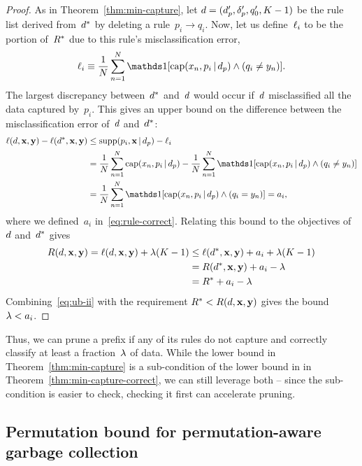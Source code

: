 \begin{proof}
As in Theorem~\ref{thm:min-capture},
let ${{d} =  (d_p', \delta_p', q_0', K-1)}$ be the rule list
derived from~$d^*$ by deleting a rule~${p_i \rightarrow q_i}$.
%
Now, let us define~$\ell_i$ to be the portion of~$R^*$
due to this rule's misclassification error,
\begin{align}
\Loss_i \equiv \frac{1}{N} \sum_{n=1}^N
  \one [ \Cap(x_n, p_i \given \Prefix) \wedge (q_i \neq y_n) ].
\end{align}
The largest discrepancy between~$d^*$ and~${d}$ would
occur if~${d}$ misclassified all the data captured by~$p_i$.
%
This gives an upper bound on the difference between
the misclassification error of~${d}$ and~$d^*$:
\begin{align}
\Loss(\RL, \x, \y) - \Loss(\OptimalRL, \x, \y)
&\le \Supp(p_i, \x \given \Prefix) - \Loss_i \nn \\
&= \frac{1}{N} \sum_{n=1}^N \Cap(x_n, p_i \given \Prefix)
  - \frac{1}{N} \sum_{n=1}^N
  \one [ \Cap(x_n, p_i \given \Prefix) \wedge (q_i \neq y_n) ] \nn \\
&= \frac{1}{N} \sum_{n=1}^N
  \one [ \Cap(x_n, p_i \given \Prefix) \wedge (q_i = y_n) ] = a_i,
\end{align}
where we defined~$a_i$ in~\eqref{eq:rule-correct}.
%
Relating this bound to the objectives of~${d}$ and~$d^*$ gives
\begin{align}
\Obj(\RL, \x, \y) = \Loss(\RL, \x, \y) + \Reg (K - 1)
&\le \Loss(\OptimalRL, \x, \y) + a_i + \Reg(K - 1) \nn \\
&= \Obj(\OptimalRL, \x, \y) + a_i - \Reg \nn \\
&= \OptimalObj + a_i - \Reg
\label{eq:ub-ii}
\end{align}
Combining~\eqref{eq:ub-ii} with the requirement
${R^* < R({d}, \mathbf{x}, \mathbf{y})}$ gives the bound~${{\lambda} < a_i}$.
\end{proof}

Thus, we can prune a prefix if any of its rules do not capture
and correctly classify at least a fraction~${\lambda}$ of data.
%
While the lower bound in Theorem~\ref{thm:min-capture} is a sub-condition
of the lower bound in in Theorem~\ref{thm:min-capture-correct},
we can still leverage both -- since the sub-condition is easier to check,
checking it first can accelerate pruning.

\subsection{Permutation bound for permutation-aware garbage collection}
\label{sec:permutation}

